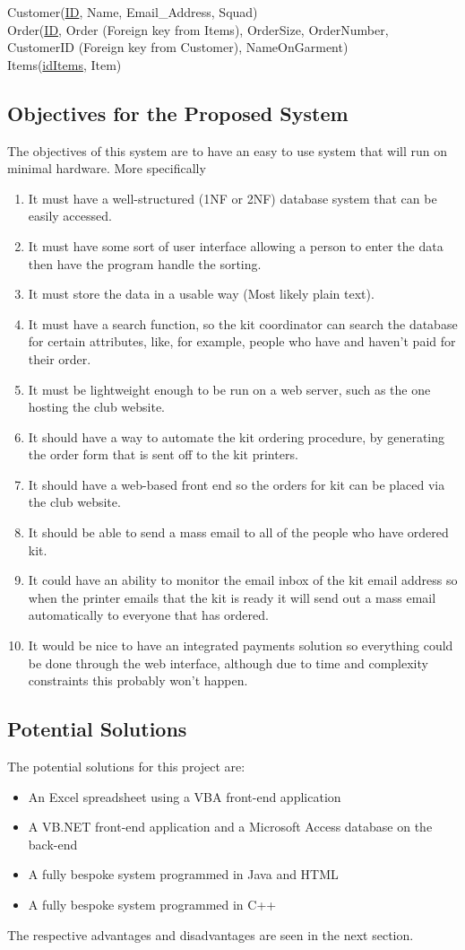 \documentclass[
11pt, %
a4paper, %
oneside, %
headinclude,footinclude, %
BCOR5mm, %
]{scrartcl}
\begin{document}
Customer(\uline{ID}, Name, Email\_Address, Squad)\\
Order(\uline{ID}, Order (Foreign key from Items), OrderSize, OrderNumber, CustomerID (Foreign key from Customer), NameOnGarment)\\
Items(\uline{idItems}, Item)

\subsection{Objectives for the Proposed System}
The objectives of this system are to have an easy to use system that will run on minimal hardware. More specifically  \begin{enumerate}
	\item It must have a well-structured (1NF or 2NF) database system that can be easily accessed.
	\item It must have some sort of user interface allowing a person to enter the data then have the program handle the sorting.
	\item It must store the data in a usable way (Most likely plain text).
	\item It must have a search function, so the kit coordinator can search the database for certain attributes, like, for example, people who have and haven't paid for their order.
	\item It must be lightweight enough to be run on a web server, such as the one hosting the club website.
	\item It should have a way to automate the kit ordering procedure, by generating the order form that is sent off to the kit printers.
	\item It should have a web-based front end so the orders for kit can be placed via the club website.
	\item It should be able to send a mass email to all of the people who have ordered kit.
	\item It could have an ability to monitor the email inbox of the kit email address so when the printer emails that the kit is ready it will send out a mass email automatically to everyone that has ordered.
	\item It would be nice to have an integrated payments solution so everything could be done through the web interface, although due to time and complexity constraints this probably won't happen.
\end{enumerate}

\subsection{Potential Solutions}
The potential solutions for this project are:\begin{itemize}
	\item An Excel spreadsheet using a VBA front-end application
	\item A VB.NET front-end application and a Microsoft Access database on the back-end
	\item A fully bespoke system programmed in Java and HTML
	\item A fully bespoke system programmed in C++
\end{itemize}
The respective advantages and disadvantages are seen in the next section.
\end{document}
